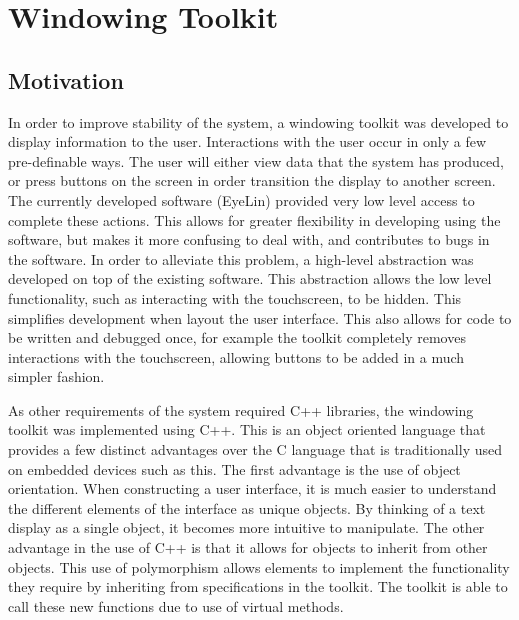 
\chapter{Windowing Toolkit} %



\ifpdf
    \graphicspath{{5/figures/PNG/}{5/figures/PDF/}{5/figures/}}
\else
    \graphicspath{{5/figures/EPS/}{5/figures/}}
\fi


\section{Motivation}

In order to improve stability of the system, a windowing toolkit was developed to display information to the user. Interactions with the user occur in only a few pre-definable ways. The user will either view data that the system has produced, or press buttons on the screen in order transition the display to another screen. The currently developed software (EyeLin) provided very low level access to complete these actions. This allows for greater flexibility in developing using the software, but makes it  more confusing to deal with, and contributes to bugs in the software. In order to alleviate this problem, a high-level abstraction was developed on top of the existing software. This abstraction allows the low level functionality, such as interacting with the touchscreen, to be hidden. This simplifies development when layout the user interface. This also allows for code to be written and debugged once, for example the toolkit completely removes interactions with the touchscreen, allowing buttons to be added in a much simpler fashion.

As other requirements of the system required C++ libraries, the windowing toolkit was implemented using C++. This is an object oriented language that provides a few distinct advantages over the C language that is traditionally used on embedded devices such as this. The first advantage is the use of object orientation. When constructing a user interface, it is much easier to understand the different elements of the interface as unique objects. By thinking of a text display as a single object, it becomes more intuitive to manipulate. The other advantage in the use of C++ is that it allows for objects to inherit from other objects. This use of polymorphism allows elements to implement the functionality they require by inheriting from specifications in the toolkit. The toolkit is able to call these new functions due to use of virtual methods.

